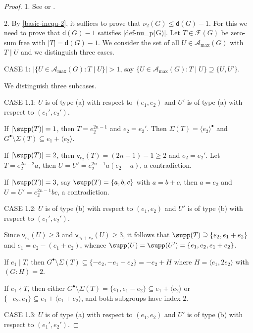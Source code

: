 \documentclass[a4paper, 10pt]{amsart}
\theoremstyle{plain}
\theoremstyle{definition}
\numberwithin{equation}{section}
\begin{document}
\begin{proof}
1. See  \cite[Theorem 3.3]{Ga-Ge02} or \cite[Corollary 4.5.8]{Ge-Gr-Zh26a}.
	
2. By \eqref{basic-inequ-2}, it suffices to prove that $\nu_2 (G) \le \mathsf d (G)-1$. For this we need to prove that $\mathsf d (G)-1$ satisfies \eqref{def-nu_p(G)}. Let $T \in \mathcal F (G)$ be zero-sum free with $|T| = \mathsf d (G)-1$. We consider the set of all $U \in \mathcal A_{\max} (G)$ with $T \mid U$ and we distinguish three cases.


\smallskip
\noindent
CASE 1:   $|\{U \in \mathcal A_{\max}(G) \colon T \mid U \}|>1$, say $\{U \in \mathcal A_{\max}(G) \colon T \mid U \} \supseteq \{U, U'\}$. 

We distinguish three subcases.

\smallskip
\noindent
CASE 1.1: $U$ is of type (a) with respect to $(e_1, e_2)$ and $U'$ is of type (a) with respect to $(e_1', e_2')$.

If $|\supp(T)|=1$, then $T=e_2^{2n - 1}$ and $e_2=e_2'$. Then $\Sigma (T)=  \langle e_2 \rangle^{\bullet}$ and $G^{\bullet} \setminus \Sigma (T) \subseteq e_1 + \langle e_2 \rangle$.

If $|\supp(T)|=2$, then $\mathsf{v}_{e_2}(T)= (2n-1)-1\ge 2$ and $e_2=e_2'$. Let $T= e_2^{2n - 2} a$, then $U=U'=e_2^{2n - 1} a (e_2 -a)$, a contradiction.

If $|\supp(T)|=3$, say $\supp(T)=\{a,b,c\}$ with $a=b+c$, then $a=e_2$ and $U=U'=e_2^{2n - 1} bc$, a contradiction.

\smallskip
\noindent
CASE 1.2:  $U$ is of type (b) with respect to $(e_1, e_2)$ and $U'$ is of type (b) with respect to $(e_1', e_2')$.

Since $\mathsf{v}_{e_2}(U) \ge 3$ and $\mathsf{v}_{e_1+e_2}(U) \ge 3$, it follows that $\supp(T) \supseteq \{e_2, e_1+e_2 \}$ and $e_1= e_2 - (e_1+e_2)$, whence $\supp(U)=\supp(U')=\{e_1, e_2, e_1+e_2 \}$.

 If $e_1\mid T$, then $G^{\bullet} \setminus \Sigma (T)\subseteq \{-e_2, -e_1-e_2\} =-e_2+ H$ where $H= \langle e_1,2e_2 \rangle$ with $(G \colon H)=2$. 

 If $e_1\nmid T$, then either
$G^{\bullet} \setminus \Sigma (T)=\{e_1, e_1-e_2\}\subseteq e_1 +\langle e_2 \rangle $ or $\{-e_2, e_1\}\subseteq e_1 +\langle e_1 +e_2 \rangle$, and both subgroups have index $2$.

\smallskip
\noindent
CASE 1.3: $U$ is of type (a) with respect to $(e_1, e_2)$ and $U'$ is of type (b) with respect to $(e_1', e_2')$. 



\end{proof}
\end{document}
